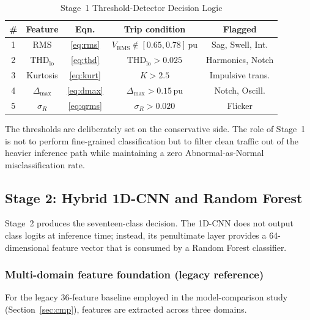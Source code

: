 \documentclass[conference]{IEEEtran}
\begin{document}
\begin{table}[!htbp]
  \centering
  \caption{Stage~1 Threshold-Detector Decision Logic}
  \label{tab:stage1}
  \footnotesize
  \setlength{\tabcolsep}{3pt}
  \renewcommand{\arraystretch}{1.2}
  \begin{tabular}{|c|c|c|c|c|}
    \hline
    \# & Feature & Eqn. & Trip condition & Flagged \\
    \hline
    1 & RMS                  & \eqref{eq:rms}  &
        $V_{\mathrm{RMS}}\!\notin\![0.65,0.78]$\,pu & Sag, Swell, Int. \\
    \hline
    2 & THD$_{\mathrm{lo}}$  & \eqref{eq:thd}  &
        $\mathrm{THD}_{\mathrm{lo}}\!>\!0.025$      & Harmonics, Notch \\
    \hline
    3 & Kurtosis             & \eqref{eq:kurt} &
        $K\!>\!2.5$                                 & Impulsive trans. \\
    \hline
    4 & $\Delta_{\max}$      & \eqref{eq:dmax} &
        $\Delta_{\max}\!>\!0.15$\,pu                & Notch, Oscill. \\
    \hline
    5 & $\sigma_R$           & \eqref{eq:qrms} &
        $\sigma_R\!>\!0.020$                        & Flicker \\
    \hline
  \end{tabular}
\end{table}

The thresholds are deliberately set on the conservative side. The role
of Stage~1 is not to perform fine-grained classification but to filter
clean traffic out of the heavier inference path while maintaining a
zero Abnormal-as-Normal misclassification rate.

\subsection{Stage 2: Hybrid 1D-CNN and Random Forest}
\label{sec:stage2}
Stage~2 produces the seventeen-class decision. The 1D-CNN does not
output class logits at inference time; instead, its penultimate layer
provides a 64-dimensional feature vector that is consumed by a Random
Forest classifier.

\subsubsection{Multi-domain feature foundation (legacy reference)}
For the legacy 36-feature baseline employed in the model-comparison
study (Section~\ref{sec:cmp}), features are extracted across three
domains.
\end{document}
